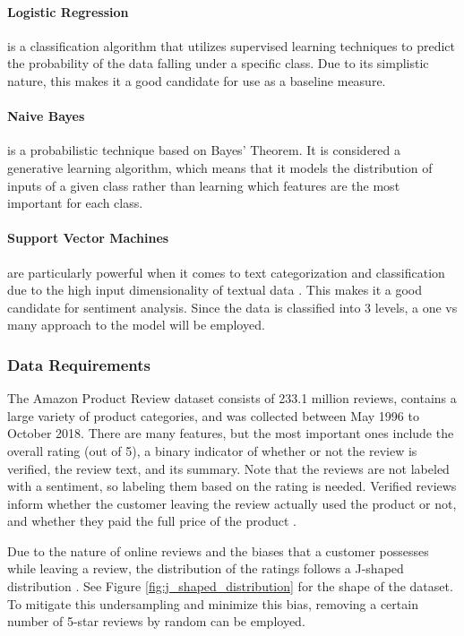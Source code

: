 \documentclass[stu,12pt,floatsintext]{apa7}
\begin{document}
\paragraph{Logistic Regression} is a classification algorithm that utilizes supervised learning techniques to predict the probability of the data falling under a specific class. Due to its simplistic nature, this makes it a good candidate for use as a baseline measure.

\paragraph{Naive Bayes} is a probabilistic technique based on Bayes' Theorem. It is considered a generative learning algorithm, which means that it models the distribution of inputs of a given class rather than learning which features are the most important for each class. 

\paragraph{Support Vector Machines} are particularly powerful when it comes to text categorization and classification due to the high input dimensionality of textual data \parencite{joachims1998svm}. This makes it a good candidate for sentiment analysis. Since the data is classified into 3 levels, a one vs many approach to the model will be employed.

\subsubsection{Data Requirements}
The Amazon Product Review dataset consists of 233.1 million reviews, contains a large variety of product categories, and was collected between May 1996 to October 2018. There are many features, but the most important ones include the overall rating (out of 5), a binary indicator of whether or not the review is verified, the review text, and its summary. Note that the reviews are not labeled with a sentiment, so labeling them based on the rating is needed. Verified reviews inform whether the customer leaving the review actually used the product or not, and whether they paid the full price of the product \parencite{amazon2024help_verified}.

Due to the nature of online reviews and the biases that a customer possesses while leaving a review, the distribution of the ratings follows a J-shaped distribution \parencite{hu2009overcoming}. See Figure \ref{fig:j_shaped_distribution} for the shape of the dataset. To mitigate this undersampling and minimize this bias, removing a certain number of 5-star reviews by random can be employed. 
\end{document}
